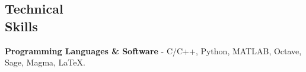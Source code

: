 \documentclass[margin,line]{resume}
\begin{document}
\begin{resume}
\begin{comment}
    \textbf{Analogues of Miller-Yu theorem in resource bounded measures
 \href{http://home.iitk.ac.in/~hishukla/miller-yu.pdf}{\small{\color{blue}[PDF]}}}		 \vspace{0mm}\\\vspace{1mm}%
    \textsl{\footnotesize Under Dr. Satyadev Nandakumar, IIT Kanpur (SURGE- 2015 Project)}\hfill\textit{(May '15 -- Jul '15)}\vspace{-3mm}\\
    \begin{list2}
\item Studied different randomness paradigms and Martin L\"of randomness.\vspace{1.5mm}
\item Studied Miller-Yu theorem and its analogues in resource bounded measures and derived resource bounded versions of the Chaitin's inequality.
\end{list2}
\end{comment}



 
    \section{\mysidestyle Technical\\Skills} 
    
    
    \textbf{Programming Languages \& Software} - C/C++, Python, MATLAB, Octave, Sage, Magma, \LaTeX.\\


	
    
\end{resume}

\end{document}
